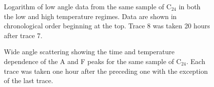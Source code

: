 \begin{figure}
\caption{Logarithm of low angle data from the same sample of C$_{24}$ in both
the low and high temperature regimes.  Data are shown in chronological order
beginning at the top.   Trace 8 was taken 20 hours after trace 7.  
\label{fig8}}
\end{figure}

\begin{figure}
\caption{Wide angle scattering showing the time and temperature dependence
of the A and F peaks for the same sample of C$_{24}$.  
Each trace was taken one hour after the preceding one with the exception
of the last trace.
\label{fig9}}
\end{figure}


